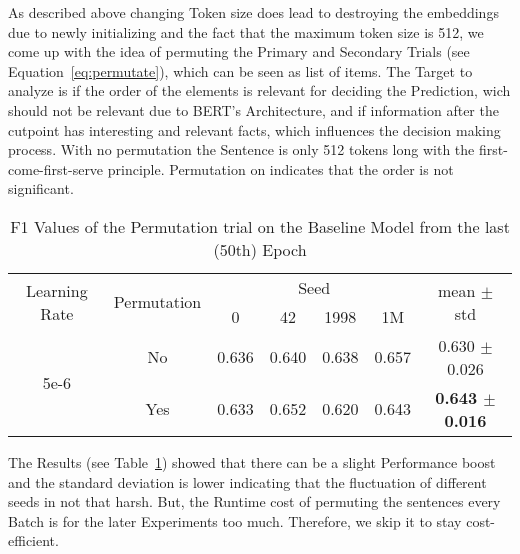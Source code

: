 As described above changing Token size does lead to destroying the embeddings due to newly
initializing and the fact that the maximum token size is 512, we come up with the idea
of permuting the Primary and Secondary Trials (see Equation~\ref{eq:permutate}), which can be seen as list of items.
The Target to analyze is if the order of the elements is relevant for deciding the Prediction, 
wich should not be relevant due to BERT's Architecture, and
if information after the cutpoint has interesting and relevant facts, which influences
the decision making process. With no permutation the 
Sentence is only 512 tokens long with the first-come-first-serve principle. Permutation on
indicates that the order is not significant.

\begin{table}[!t]
    \centering
    \caption{F1 Values of the Permutation trial on the Baseline Model from the last (50th) Epoch}
    \label{tab:my-permutation}
    \begin{tabular}{|c|c||cccc|c|}
    \hline
    \multirow{2}{*}{Learning Rate} & \multirow{2}{*}{Permutation} & \multicolumn{4}{c|}{Seed}                                                                    & \multirow{2}{*}{mean $\pm$ std} \\ \cline{3-6}
                                   &                              & \multicolumn{1}{c|}{0}     & \multicolumn{1}{c|}{42}    & \multicolumn{1}{c|}{1998}  & 1M    &                                 \\ \hline \hline
    \multirow{2}{*}{5e-6}          & No                           & \multicolumn{1}{c|}{0.636} & \multicolumn{1}{c|}{0.640} & \multicolumn{1}{c|}{0.638} & 0.657 & 0.630 $\pm$ 0.026               \\ \cline{2-7} 
                                   & Yes                          & \multicolumn{1}{c|}{0.633} & \multicolumn{1}{c|}{0.652} & \multicolumn{1}{c|}{0.620} & 0.643 & \textbf{0.643 $\pm$ 0.016}      \\ \hline
    \end{tabular}
\end{table}

The Results (see Table~\ref{tab:my-permutation}) showed that there can be a slight Performance boost and the standard deviation is lower
indicating that the fluctuation of different seeds in not that harsh. But, the Runtime cost of permuting the
sentences every Batch is for the later Experiments too much. Therefore, we skip it to stay cost-efficient.














